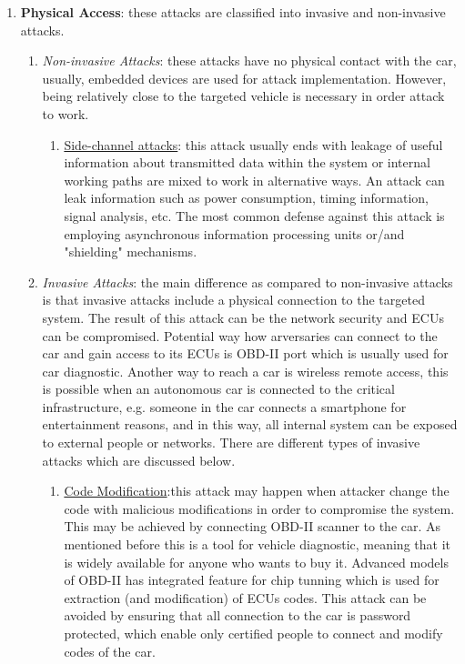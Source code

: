 \begin{itemize}
	\begin{enumerate}
		\item \textbf{Physical Access}: these attacks are classified into invasive and non-invasive attacks.
		\begin{enumerate}
			\item \textit{Non-invasive Attacks}: these attacks have no physical contact with the car, usually, embedded devices are used for attack implementation. However, being relatively close to the targeted vehicle is necessary in order attack to work.
			\begin{enumerate}
				\item \underline{Side-channel attacks}: this attack usually ends with leakage of useful information about transmitted data within the system or internal working paths are mixed to work in alternative ways. An attack can leak information such as power consumption, timing information, signal analysis, etc. The most common defense against this attack is employing asynchronous information processing units or/and "shielding"
				mechanisms.
			\end{enumerate}
			\item \textit{Invasive Attacks}: the main difference as compared to non-invasive attacks is that invasive attacks include a physical connection to the targeted system. The result of this attack can be the network security and \glspl{ECU} can be compromised. Potential way how arversaries can connect to the car and gain access to its \glspl{ECU} is \gls{OBD-II} port which is usually used for car diagnostic. Another way to reach a car is wireless remote access, this is possible when an autonomous car is connected to the critical infrastructure, e.g. someone in the car connects a smartphone for entertainment reasons, and in this way, all internal system can be exposed to external people or networks. There are different types of invasive attacks which are discussed below.
			\begin{enumerate}
				\item \underline{Code Modification}:this attack may happen when attacker change the code with malicious modifications in order to compromise the system. This may be achieved by connecting \gls{OBD-II} scanner to the car. As mentioned before this is a tool for vehicle diagnostic, meaning that it is widely available for anyone who wants to buy it. Advanced models of \gls{OBD-II} has integrated feature for chip tunning which is used for extraction (and modification) of \glspl{ECU} codes. This attack can be avoided by ensuring that all connection to the car is password protected, which enable only certified people to connect and modify codes of the car.

\end{enumerate}
\end{enumerate}
\end{enumerate}
\end{itemize}
